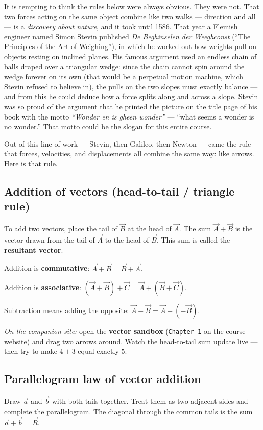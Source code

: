 It is tempting to think the rules below were always obvious. They were not.
That two forces acting on the same object combine like two walks --- direction
and all --- is a \emph{discovery about nature}, and it took until 1586. That year
a Flemish engineer named Simon Stevin published \emph{De Beghinselen der
Weeghconst} (``The Principles of the Art of Weighing''), in which he worked
out how weights pull on objects resting on inclined planes. His famous
argument used an endless chain of balls draped over a triangular wedge: since
the chain cannot spin around the wedge forever on its own (that would be a
perpetual motion machine, which Stevin refused to believe in), the pulls on
the two slopes must exactly balance --- and from this he could deduce how a
force splits along and across a slope. Stevin was so proud of the argument
that he printed the picture on the title page of his book with the motto
\emph{``Wonder en is gheen wonder''} --- ``what seems a wonder is no wonder.''
That motto could be the slogan for this entire course.

Out of this line of work --- Stevin, then Galileo, then Newton --- came the rule
that forces, velocities, and displacements all combine the same way: like
arrows. Here is that rule.

\subsection{Addition of vectors (head-to-tail / triangle rule)}
To add two vectors, place the tail of $\vec{B}$ at the head of $\vec{A}$. The sum $\vec{A}+\vec{B}$ is
the vector drawn from the tail of $\vec{A}$ to the head of $\vec{B}$. This sum is called the
\textbf{resultant vector}.

Addition is \textbf{commutative}: $\vec{A}+\vec{B} = \vec{B}+\vec{A}$.

Addition is \textbf{associative}: $(\vec{A}+\vec{B})+\vec{C} = \vec{A}+(\vec{B}+\vec{C})$.

Subtraction means adding the opposite: $\vec{A}-\vec{B} = \vec{A}+(-\vec{B})$.

\medskip
\noindent\textit{On the companion site:} open the \textbf{vector sandbox}
(\texttt{Chapter 1} on the course website) and drag two arrows around. Watch
the head-to-tail sum update live --- then try to make $4+3$ equal exactly $5$.

\subsection{Parallelogram law of vector addition}
Draw $\vec{a}$ and $\vec{b}$ with both tails together. Treat them as two adjacent sides and
complete the parallelogram. The diagonal through the common tails is the sum $\vec{a}+\vec{b}=\vec{R}$.

